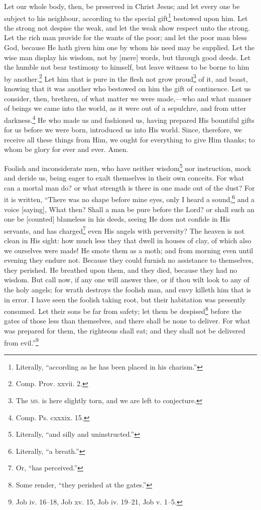 
Let our whole body, then, be preserved in Christ Jesus; and let every one be subject to his neighbour, according to the special gift\footnote{Literally, “according as he has been placed in his charism.”} bestowed upon him. Let the strong not despise the weak, and let the weak show respect unto the strong. Let the rich man provide for the wants of the poor; and let the poor man bless God, because He hath given him one by whom his need may be supplied. Let the wise man display his wisdom, not by [mere] words, but through good deeds. Let the humble not bear testimony to himself, but leave witness to be borne to him by another.\footnote{Comp. Prov. xxvii. 2.} Let him that is pure in the flesh not grow proud\footnote{The \textsc{ms.} is here slightly torn, and we are left to conjecture.} of it, and boast, knowing that it was another who bestowed on him the gift of continence. Let us consider, then, brethren, of what matter we were made,—who and what manner of beings we came into the world, as it were out of a sepulchre, and from utter darkness.\footnote{Comp. Ps. cxxxix. 15.} He who made us and fashioned us, having prepared His bountiful gifts for us before we were born, introduced us into His world. Since, therefore, we receive all these things from Him, we ought for everything to give Him thanks; to whom be glory for ever and ever. Amen.


Foolish and inconsiderate men, who have neither wisdom\footnote{Literally, “and silly and uninstructed.”} nor instruction, mock and deride us, being eager to exalt themselves in their own conceits. For what can a mortal man do? or what strength is there in one made out of the dust? For it is written, “There was no shape before mine eyes, only I heard a sound,\footnote{Literally, “a breath.”} and a voice [saying], What then? Shall a man be pure before the Lord? or shall such an one be [counted] blameless in his deeds, seeing He does not confide in His servants, and has charged\footnote{Or, “has perceived.”} even His angels with perversity? The heaven is not clean in His sight: how much less they that dwell in houses of clay, of which also we ourselves were made! He smote them as a moth; and from morning even until evening they endure not. Because they could furnish no assistance to themselves, they perished. He breathed upon them, and they died, because they had no wisdom. But call now, if any one will answer thee, or if thou wilt look to any of the holy angels; for wrath destroys the foolish man, and envy killeth him that is in error. I have seen the foolish taking root, but their habitation was presently consumed. Let their sons be far from safety; let them be despised\footnote{Some render, “they perished at the gates.”} before the gates of those less than themselves, and there shall be none to deliver. For what was prepared for them, the righteous shall eat; and they shall not be delivered from evil.”\footnote{Job iv. 16–18, Job xv. 15, Job iv. 19–21, Job v. 1–5.}

